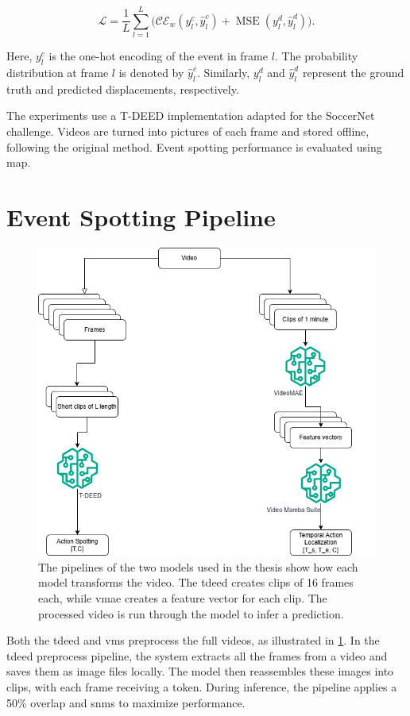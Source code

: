 \[
\mathcal{L} = \frac{1}{L}\sum_{l=1}^{L}\Big(\mathcal{CE}_{w}(y_l^{c},\hat{y}_l^c) + \operatorname{MSE}(y_l^{d},\hat{y}_l^d)\Big).
\]

Here, \(y_l^{c}\) is the one-hot encoding of the event in frame \(l\). The probability distribution at frame \(l\) is denoted by \(\hat{y}_l^c\). Similarly, \(y_l^{d}\) and \(\hat{y}_l^d\) represent the ground truth and predicted displacements, respectively.

The experiments use a T-DEED implementation adapted for the SoccerNet challenge. Videos are turned into pictures of each frame and stored offline, following the original method. Event spotting performance is evaluated using \acrlong{map}.


\section{Event Spotting Pipeline} 

\begin{figure}
    \centering
    \includegraphics[width=0.75\linewidth]{figures/pipeline.png}
    \caption{The pipelines of the two models used in the thesis show how each model transforms the video. The \acrshort{tdeed} creates clips of 16 frames each, while \acrshort{vmae} creates a feature vector for each clip. The processed video is run through the model to infer a prediction.}
    \label{fig:pipeline}
\end{figure}

Both the \acrfull{tdeed} and \acrfull{vms} preprocess the full videos, as illustrated in \cref{fig:pipeline}. In the \acrshort{tdeed} preprocess pipeline, the system extracts all the frames from a video and saves them as image files locally. The model then reassembles these images into clips, with each frame receiving a token. During inference, the pipeline applies a 50\% overlap and \acrfull{snms} to maximize performance.

